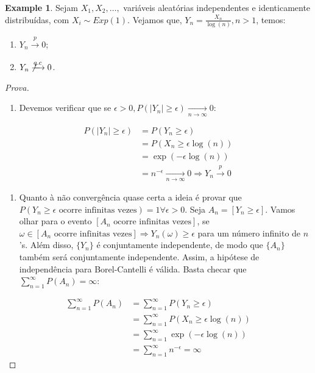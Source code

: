 \documentclass[
]{article}
\providecommand{\tightlist}{%
  \setlength{\itemsep}{0pt}\setlength{\parskip}{0pt}}
\theoremstyle{definition}
\theoremstyle{definition}
\newtheorem{example}{Example}[section]
\theoremstyle{definition}
\theoremstyle{definition}
\theoremstyle{remark}
\begin{document}
\begin{example}

Sejam \(X_{1},X_{2},\ldots,\) variáveis aleatórias independentes e identicamente distribuídas, com \(X_{i} \sim Exp(1)\). Vejamos que, \(Y_{n} = \frac{X_{n}}{\log(n)},n > 1\), temos:

\begin{enumerate}
\def\labelenumi{\arabic{enumi})}
\item
  \(Y_{n} \xrightarrow[]{p}0\);
\item
  \(Y_{n} \not\xrightarrow[]{q.c}0\).
\end{enumerate}

\begin{proof}[Prova]
\leavevmode

\begin{enumerate}
\def\labelenumi{\arabic{enumi})}
\tightlist
\item
  Devemos verificar que se \(\epsilon > 0, P(|Y_{n}| \ge \epsilon) \xrightarrow[n \to \infty]{} 0\):
\end{enumerate}

\begin{align*}
P(|Y_{n}| \ge \epsilon) &= P(Y_{n} \ge \epsilon) \\
&= P(X_{n} \ge \epsilon \log(n)) \\
&= \exp(-\epsilon \log(n)) \\
&= n^{-\epsilon} \xrightarrow[n \to \infty]{} 0 \Rightarrow Y_{n} \xrightarrow[]{p} 0
\end{align*}

\begin{enumerate}
\def\labelenumi{\arabic{enumi})}
\setcounter{enumi}{1}
\tightlist
\item
  Quanto à não convergência quase certa a ideia é provar que \(P(Y_{n} \ge \epsilon \text{ ocorre infinitas vezes}) = 1 \forall \epsilon > 0\). Seja \(A_{n} = [Y_{n} \ge \epsilon]\). Vamos olhar para o evento \([A_{n} \text{ ocorre infinitas vezes}]\), se \(\omega \in [A_{n} \text{ ocorre infinitas vezes}] \Rightarrow Y_{n}(\omega) \ge \epsilon\) para um número infinito de \(n\)'s. Além disso, \(\{Y_{n}\}\) é conjuntamente independente, de modo que \(\{A_{n}\}\) também será conjuntamente independente. Assim, a hipótese de independência para Borel-Cantelli é válida. Basta checar que \(\sum_{n=1}^{\infty}P(A_{n}) = \infty\):
\end{enumerate}

\begin{align*}
\sum_{n=1}^{\infty}P(A_{n}) &= \sum_{n=1}^{\infty}P(Y_{n} \ge \epsilon) \\
&= \sum_{n=1}^{\infty}P(X_{n} \ge \epsilon \log(n)) \\
&= \sum_{n=1}^{\infty}\exp(-\epsilon \log(n)) \\
&= \sum_{n=1}^{\infty}n^{-\epsilon} = \infty
\end{align*}

\end{proof}

\end{example}
\end{document}
